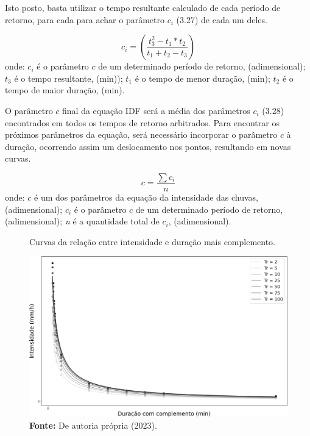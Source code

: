 Isto posto, basta utilizar o tempo resultante calculado de cada período de retorno, para cada para achar o parâmetro $c_i$ (3.27) de cada um deles.\bigskip

\begin{equation}
c_i = \left(\frac{t_3^2 - t_1 * t_2}{t_1 + t_2 - t_3}\right)
\end{equation}
\newline
onde:
\newline
\textit{$c_i$} é o parâmetro $c$ de um determinado período de retorno, (adimensional);
\newline
\textit{$t_3$} é o tempo resultante, (min));
\newline
\textit{$t_1$} é o tempo de menor duração, (min);
\newline
\textit{$t_2$} é o tempo de maior duração, (min).\bigskip

O parâmetro $c$ final da equação IDF será a média dos parâmetros $c_i$ 
(3.28) encontrados em todos os tempos de retorno arbitrados. Para encontrar os próximos parâmetros da equação, será necessário incorporar o parâmetro $c$ à duração, ocorrendo assim um deslocamento nos pontos, resultando em novas curvas.\bigskip

\begin{equation}
c = \frac{\sum{c_i}}{n}
\end{equation}
\newline
\newline
\newline
onde:
\newline
\textit{$c$} é um dos parâmetros da equação da intensidade das chuvas, (adimensional);
\newline
\textit{$c_i$} é o parâmetro $c$ de um determinado período de retorno, (adimensional);
\newline
\textit{n} é a quantidade total de $c_i$, (adimensional).\bigskip

\begin{figure}[!ht]
	\centering
	\caption{Curvas da relação entre intensidade e duração mais complemento.}
	\includegraphics[width=.7325\linewidth]{figuras/curvas_idf_de_intensidade_e_duracao_com_complemento.png}
	\caption*{\textbf{Fonte:} De autoria própria (2023).}
	\label{fig:curvas_idf_de_intensidade_e_duracao_com_complemento.png}
\end{figure}

